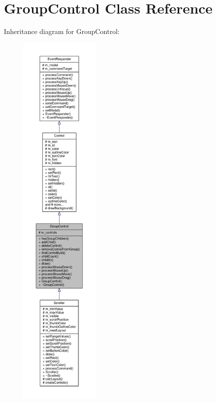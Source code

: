 \hypertarget{classGroupControl}{}\section{Group\+Control Class Reference}
\label{classGroupControl}


Inheritance diagram for Group\+Control\+:
\nopagebreak
\begin{figure}[H]
\begin{center}
\leavevmode
\includegraphics[height=550pt]{d1/dad/classGroupControl__inherit__graph}
\end{center}
\end{figure}


